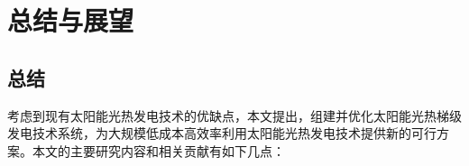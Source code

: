 \chapter{总结与展望}
\section{总结}

考虑到现有太阳能光热发电技术的优缺点，本文提出，组建并优化太阳能光热梯级发电技术系统，为大规模低成本高效率利用太阳能光热发电技术提供新的可行方案。本文的主要研究内容和相关贡献有如下几点：

